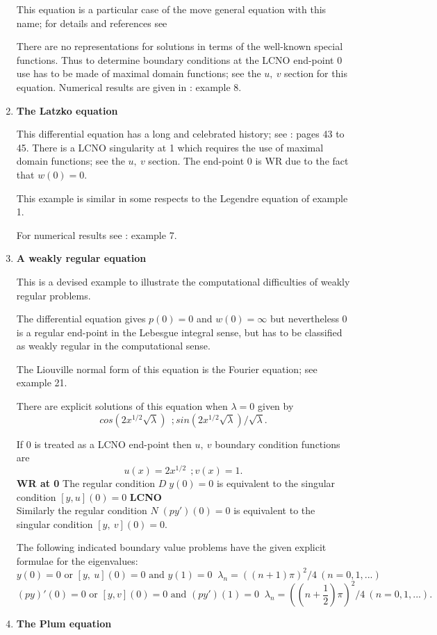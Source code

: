 \begin{enumerate}
This equation is a particular case of the move general equation with
this name; for details and references see \cite{H}

There are no representations for solutions in terms of the well-known
special functions.  Thus to determine boundary conditions at the LCNO
end-point $0$ use has to be made of maximal domain functions; see the
$u, \ v$ section for this equation.  Numerical results are given in
\cite{BEZ}: example 8.
\item %
{\bf The Latzko equation}

This differential equation has a long and celebrated history; see \cite{F}:
pages 43 to 45. There is a LCNO singularity at 1 which requires the
use of maximal domain functions; see the $u, \ v$ section.  The
end-point $0$ is WR due to the fact that $w(0) = 0$.

This example is similar in some respects to the Legendre equation of
example 1.

For numerical results see \cite{BEZ}: example 7.
\item%
{\bf A weakly regular equation}

This is a devised example to illustrate the computational difficulties
of weakly regular problems.

The differential equation gives $p(0) = 0$
and $w(0) = \infty $ but nevertheless $0$ is a regular end-point in the
Lebesgue integral sense, but has to be classified as weakly regular in
the computational sense.

The Liouville normal form of this equation is the Fourier equation; see
example 21.

There are explicit solutions of this equation when $\lambda = 0$ given by
$$ cos (2x^{1/2} \surd \lambda ) \  \ ; sin (2x^{1/2} \surd \lambda ) /
\surd \lambda . $$

If $0$ is treated as a LCNO end-point then $u, \ v$ boundary condition
functions are
$$ u(x) = 2x^{1/2} \ \ ; v(x) = 1 . $$
{\bf WR at 0} The regular condition $D \; y(0) = 0 $ is equivalent to the 
singular condition $[y,u](0) = 0$ {\bf LCNO}
\\
Similarly the regular condition $N \; (py')(0) = 0$ is equivalent to the 
singular condition $ [y, \ v] (0) = 0$.

The following indicated boundary value problems have the given explicit
formulae for the eigenvalues:
$$ y(0) = 0 {\mbox{ or }} [y, \ u] (0) = 0 {\mbox{ and }} y(1) = 0 \; \;
\lambda_n = ((n+1) \pi)^2 /4 \ (n=0, 1,... ) $$
$$ (py)'(0) = 0 {\mbox{ or }} [y,v](0) = 0 {\mbox{ and }} (py')(1) = 0
\; \; \lambda_n  = ((n+ \dfrac{1}{2} ) \pi ) ^2 /4 \ (n=0,1, ...). $$
\item %
{\bf The Plum equation}


\end{enumerate}
